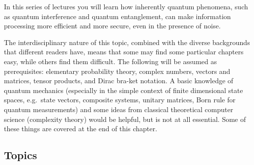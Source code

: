 \documentclass[fleqn]{article}
\begin{document}
In this series of lectures you will learn how inherently quantum phenomena, such as quantum interference and quantum entanglement, can make information processing more efficient and more secure, even in the presence of noise.

The interdisciplinary nature of this topic, combined with the diverse backgrounds that different readers have, means that some may find some particular chapters easy, while others find them difficult.
The following will be assumed as prerequisites: elementary probability theory, complex numbers, vectors and matrices, tensor products, and Dirac bra-ket notation.
A basic knowledge of quantum mechanics (especially in the simple context of finite dimensional state spaces, e.g.~state vectors, composite systems, unitary matrices, Born rule for quantum measurements) and some ideas from classical theoretical computer science (complexity theory) would be helpful, but is not at all essential.
Some of these things are covered at the end of this chapter.

\hypertarget{topics}{%
\subsection*{Topics}\label{topics}}
\end{document}
